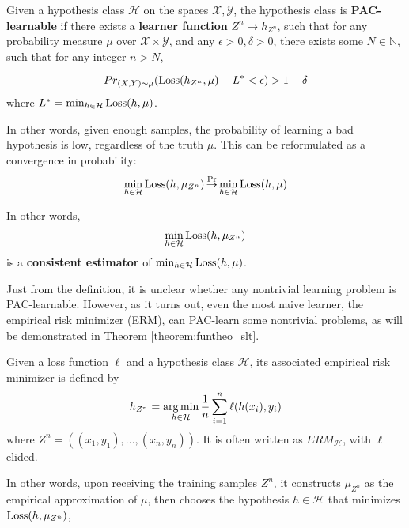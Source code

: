 \begin{defn}
\label{defn:pac}
Given a hypothesis class $\mathcal{H}$ on the spaces $\mathcal{X}, \mathcal{Y}$, the hypothesis class is \textbf{PAC-learnable} if there exists a \textbf{learner function} $Z^n \mapsto h_{Z^n}$, such that for any probability measure $\mu$ over $\mathcal{X}\times \mathcal{Y}$, and any $\epsilon > 0, \delta > 0$, there exists some $N\in \mathbb{N}$, such that for any integer $n > N$, 

\begin{equation}
\label{eq:pac}
Pr_{(X, Y)\sim \mu}(\operatorname{Loss}(h_{Z^n}, \mu) - L^* < \epsilon) > 1- \delta
\end{equation}
where $L^* = \min_{h\in \mathcal{H}} \operatorname{Loss}(h, \mu)$.
\end{defn}

In other words, given enough samples, the probability of learning a bad hypothesis is low, regardless of the truth $\mu$. This can be reformulated as a convergence in probability: 
\begin{equation}
\min_{h\in \mathcal{H}} \operatorname{Loss}(h, \mu_{Z^n})\operatorname*{\stackrel{\text {Pr}}{\to}}  \min_{h\in \mathcal{H}} \operatorname{Loss}(h, \mu)
\end{equation}

In other words, 
$$\min_{h\in \mathcal{H}} \operatorname{Loss}(h, \mu_{Z^n}) $$ 
is a \textbf{consistent estimator} of $\min_{h\in \mathcal{H}} \operatorname{Loss}(h, \mu) $.

Just from the definition, it is unclear whether any nontrivial learning problem is PAC-learnable. However, as it turns out, even the most naive learner, the empirical risk minimizer (ERM), can PAC-learn some nontrivial problems, as will be demonstrated in Theorem \ref{theorem:funtheo_slt}.

\begin{defn}\label{defn:erm}
Given a loss function $\ell$ and a hypothesis class $\mathcal{H}$, its associated empirical risk minimizer is defined by 
\begin{equation}
\label{eq:erm}
h_{Z^n} = \operatorname*{arg\,min}_{h\in\mathcal{H}} \frac 1 n \sum_{i = 1}^n \ell(h(x_i), y_i)
\end{equation}
where $Z^n = ((x_1, y_1), ..., (x_n, y_n))$. It is often written as $ERM_{\mathcal{H}}$, with $\ell$ elided.
\end{defn}

In other words, upon receiving the training samples $Z^n$, it constructs $\mu_{Z^n}$ as the empirical approximation of $\mu$, then chooses the hypothesis $h\in\mathcal{H}$ that minimizes $\operatorname{Loss}(h, \mu_{Z^n})$, 

